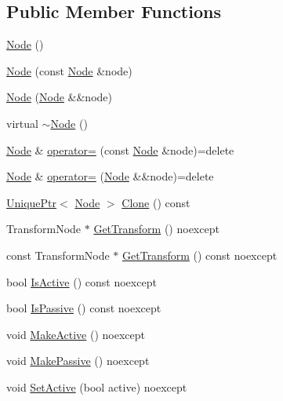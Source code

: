 \subsection*{Public Member Functions}
\begin{DoxyCompactItemize}
\item 
\hyperlink{classmage_1_1_node_a58b816eaa1dfd3c4b7f14896f190587f}{Node} ()
\item 
\hyperlink{classmage_1_1_node_af9da591163469f210895f3a5b389d7cc}{Node} (const \hyperlink{classmage_1_1_node}{Node} \&node)
\item 
\hyperlink{classmage_1_1_node_adbc40b6c4100f74faa2b59a7a0b79388}{Node} (\hyperlink{classmage_1_1_node}{Node} \&\&node)
\item 
virtual \hyperlink{classmage_1_1_node_a1369fc11b331abacbaf11aeb5729e871}{$\sim$\+Node} ()
\item 
\hyperlink{classmage_1_1_node}{Node} \& \hyperlink{classmage_1_1_node_ad10ea13608963acfa06d3c1577314da5}{operator=} (const \hyperlink{classmage_1_1_node}{Node} \&node)=delete
\item 
\hyperlink{classmage_1_1_node}{Node} \& \hyperlink{classmage_1_1_node_a007043de35c65edb9a0d790824186151}{operator=} (\hyperlink{classmage_1_1_node}{Node} \&\&node)=delete
\item 
\hyperlink{namespacemage_a8c307fbcc33bce9b7f2aa4c26c3b95cf}{Unique\+Ptr}$<$ \hyperlink{classmage_1_1_node}{Node} $>$ \hyperlink{classmage_1_1_node_a18e08151571435d319be2414474c93c0}{Clone} () const
\item 
Transform\+Node $\ast$ \hyperlink{classmage_1_1_node_ab789d7674ed06d3e10114dd6d4b4334c}{Get\+Transform} () noexcept
\item 
const Transform\+Node $\ast$ \hyperlink{classmage_1_1_node_acbffccfec34313d8583546204c3d9fda}{Get\+Transform} () const noexcept
\item 
bool \hyperlink{classmage_1_1_node_a6fce6afdcfdde0e5dff5b219cee4f372}{Is\+Active} () const noexcept
\item 
bool \hyperlink{classmage_1_1_node_a5fb6ac39c7e0d630944594cd5426f61a}{Is\+Passive} () const noexcept
\item 
void \hyperlink{classmage_1_1_node_a3945ebd27cbb587d3fd0140df55eb4fb}{Make\+Active} () noexcept
\item 
void \hyperlink{classmage_1_1_node_aee4af2ccc576c422643d478ffafce5c4}{Make\+Passive} () noexcept
\item 
void \hyperlink{classmage_1_1_node_af123050daa89e50f5468b630061aae53}{Set\+Active} (bool active) noexcept

\end{DoxyCompactItemize}
